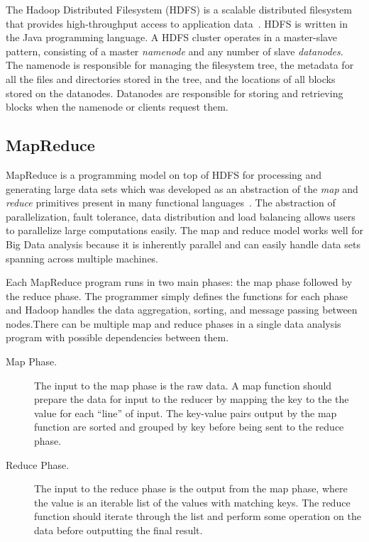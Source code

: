 The Hadoop Distributed Filesystem (HDFS) is a scalable distributed filesystem that provides high-throughput access to application data~\cite{hdfs}. HDFS is written in the Java programming language. A HDFS cluster operates in a master-slave pattern, consisting of a master \textit{namenode} and any number of slave \textit{datanodes}. The namenode is responsible for managing the filesystem tree, the metadata for all the files and directories stored in the tree, and the locations of all blocks stored on the datanodes. Datanodes are responsible for storing and retrieving blocks when the namenode or clients request them.

\subsection{MapReduce}\label{sec:mapreduce}
MapReduce is a programming model on top of HDFS for processing and generating large data sets which was developed as an abstraction of the \textit{map} and \textit{reduce} primitives present in many functional languages~\cite{mapreduce,Dean:2008:MSD:1327452.1327492}.  The abstraction of parallelization, fault tolerance, data distribution and load balancing allows users to parallelize large computations easily. The map and reduce model works well for Big Data analysis because it is inherently parallel and can easily handle data sets spanning across multiple machines.

Each MapReduce program runs in two main phases: the map phase followed by the reduce phase. The programmer simply defines the functions for each phase and Hadoop handles the data aggregation, sorting, and message passing between nodes.There can be multiple map and reduce phases in a single data analysis
program with possible dependencies between them. 
\begin{description}
 \item[Map Phase.] The input to the map phase is the raw data. A map function
should prepare the data for input to the reducer by mapping the key to the the
value for each ``line'' of input. The key-value pairs output by the map function
are sorted and grouped by key before being sent to the reduce phase. 
 \item[Reduce Phase.] The input to the reduce phase is the output from the map
phase, where the value is an iterable list of the values with matching keys.
The reduce function should iterate through the list and perform some operation
on the data before outputting the final result. 
 \end{description}

